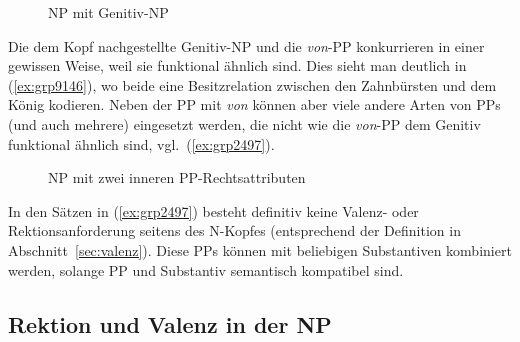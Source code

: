 \begin{figure}[!htbp]
  \centering
  \caption{NP mit Genitiv-NP}
  \label{fig:ngrmitngr}
\end{figure}


Die dem Kopf nachgestellte Genitiv-NP und die \textit{von}-PP konkurrieren in einer gewissen Weise, weil sie funktional ähnlich sind.
Dies sieht man deutlich in (\ref{ex:grp9146}), wo beide eine Besitzrelation zwischen den Zahnbürsten und dem König kodieren.
Neben der PP mit \textit{von} können aber viele andere Arten von PPs (und auch mehrere) eingesetzt werden, die nicht wie die \textit{von}-PP dem Genitiv funktional ähnlich sind, vgl.\ (\ref{ex:grp2497}).

\begin{exe}
  \ex\label{ex:grp2497}
  \begin{xlist}
  \end{xlist}
\end{exe}

\begin{figure}[!htbp]
  \centering
  \caption{NP mit zwei inneren PP-Rechtsattributen}
  \label{fig:grp2497c}
\end{figure}

In den Sätzen in (\ref{ex:grp2497}) besteht definitiv keine Valenz- oder Rektionsanforderung seitens des N-Kopfes (entsprechend der Definition in Abschnitt~\ref{sec:valenz}).
Diese PPs können mit beliebigen Substantiven kombiniert werden, solange PP und Substantiv semantisch kompatibel sind.

\subsection{Rektion und Valenz in der NP}

